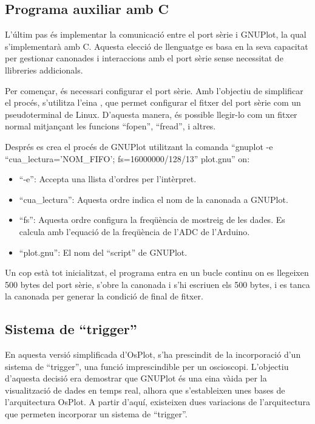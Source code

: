 \documentclass{tfgitic}[2023/06/30]
\begin{document}
\newpage

\subsection{Programa auxiliar amb C}

L'últim pas és implementar la comunicació entre el port sèrie i
GNUPlot, la qual s'implementarà amb C. Aquesta elecció de llenguatge
es basa en la seva capacitat per gestionar canonades i interaccions
amb el port sèrie sense necessitat de llibreries addicionals.

Per començar, és necessari configurar el port sèrie. Amb l'objectiu
de simplificar el procés, s'utilitza l'eina \cite[``stty'']{stty}, que
permet configurar el fitxer del port sèrie com un pseudoterminal de
Linux. D'aquesta manera, és possible llegir-lo com un fitxer normal
mitjançant les funcions ``fopen'', ``fread'', i altres.

Després es crea el procés de GNUPlot utilitzant la comanda ``gnuplot
-e ``cua\_lectura='NOM\_FIFO'; fs=16000000/128/13'' plot.gnu'' on:
\begin{itemize}
      \item ``-e'': Accepta una llista d'ordres per l'intèrpret.
      \item ``cua\_lectura'': Aquesta ordre indica el nom de la
            canonada a GNUPlot.
      \item ``fs'': Aquesta ordre configura la freqüència de mostreig de
            les dades. Es calcula amb l'equació de la freqüència de l'ADC de
            l'Arduino.
      \item ``plot.gnu'': El nom del ``script'' de GNUPlot.
\end{itemize}

Un cop està tot inicialitzat, el programa entra en un bucle continu on
es llegeixen 500 bytes del port sèrie, s'obre la canonada i s'hi
escriuen els 500 bytes, i es tanca la canonada per generar la condició
de final de fitxer.

\subsection{Sistema de ``trigger''}

En aquesta versió simplificada d'OsPlot, s'ha prescindit de la
incorporació d'un sistema de ``trigger'', una funció imprescindible
per un osci\lgem oscopi. L'objectiu d'aquesta decisió era demostrar
que GNUPlot és una eina và\lgem ida per la visualització de dades en
temps real, alhora que s'estableixen unes bases de l'arquitectura
OsPlot. A partir d'aquí, existeixen dues variacions de l'arquitectura
que permeten incorporar un sistema de ``trigger''.
\end{document}

